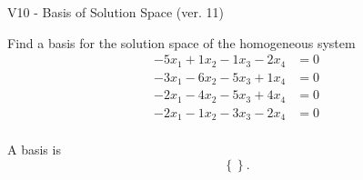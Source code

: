 \begin{exercise}
  \begin{exerciseTitle}V10 - Basis of Solution Space (ver. 11)\end{exerciseTitle}
  \begin{exerciseStatement}
    Find a basis for the solution space of the homogeneous system 
\begin{align*}
 -5 x_ 1 + 1 x_ 2 -1 x_ 3 -2 x_ 4 &= 0  \\ 
  -3 x_ 1 -6 x_ 2 -5 x_ 3 + 1 x_ 4 &= 0  \\ 
  -2 x_ 1 -4 x_ 2 -5 x_ 3 + 4 x_ 4 &= 0  \\ 
  -2 x_ 1 -1 x_ 2 -3 x_ 3 -2 x_ 4 &= 0  \\ 
 \end{align*}


 
  \end{exerciseStatement}

  \begin{exerciseAnswer}
   A basis is   
\[\left\{\right\}.\]

  


  \end{exerciseAnswer}
\end{exercise}